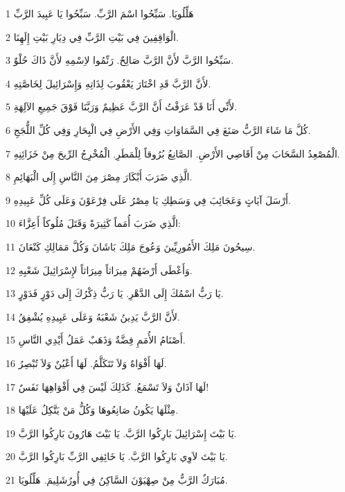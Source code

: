 \par 1 هَلِّلُويَا. سَبِّحُوا اسْمَ الرَّبِّ. سَبِّحُوا يَا عَبِيدَ الرَّبِّ
\par 2 الْوَاقِفِينَ فِي بَيْتِ الرَّبِّ فِي دِيَارِ بَيْتِ إِلَهِنَا.
\par 3 سَبِّحُوا الرَّبَّ لأَنَّ الرَّبَّ صَالِحٌ. رَنِّمُوا لاِسْمِهِ لأَنَّ ذَاكَ حُلْوٌ.
\par 4 لأَنَّ الرَّبَّ قَدِ اخْتَارَ يَعْقُوبَ لِذَاتِهِ وَإِسْرَائِيلَ لِخَاصَّتِهِ.
\par 5 لأَنِّي أَنَا قَدْ عَرَفْتُ أَنَّ الرَّبَّ عَظِيمٌ وَرَبَّنَا فَوْقَ جَمِيعِ الآلِهَةِ.
\par 6 كُلَّ مَا شَاءَ الرَّبُّ صَنَعَ فِي السَّمَاوَاتِ وَفِي الأَرْضِ فِي الْبِحَارِ وَفِي كُلِّ اللُّجَجِ.
\par 7 الْمُصْعِدُ السَّحَابَ مِنْ أَقَاصِي الأَرْضِ. الصَّانِعُ بُرُوقاً لِلْمَطَرِ. الْمُخْرِجُ الرِّيحَ مِنْ خَزَائِنِهِ.
\par 8 الَّذِي ضَرَبَ أَبْكَارَ مِصْرَ مِنَ النَّاسِ إِلَى الْبَهَائِمِ.
\par 9 أَرْسَلَ آيَاتٍ وَعَجَائِبَ فِي وَسَطِكِ يَا مِصْرُ عَلَى فِرْعَوْنَ وَعَلَى كُلِّ عَبِيدِهِ.
\par 10 الَّذِي ضَرَبَ أُمَماً كَثِيرَةً وَقَتَلَ مُلُوكاً أَعِزَّاءَ:
\par 11 سِيحُونَ مَلِكَ الأَمُورِيِّينَ وَعُوجَ مَلِكَ بَاشَانَ وَكُلَّ مَمَالِكِ كَنْعَانَ.
\par 12 وَأَعْطَى أَرْضَهُمْ مِيرَاثاً مِيرَاثاً لإِسْرَائِيلَ شَعْبِهِ.
\par 13 يَا رَبُّ اسْمُكَ إِلَى الدَّهْرِ. يَا رَبُّ ذِكْرُكَ إِلَى دَوْرٍ فَدَوْرٍ.
\par 14 لأَنَّ الرَّبَّ يَدِينُ شَعْبَهُ وَعَلَى عَبِيدِهِ يُشْفِقُ.
\par 15 أَصْنَامُ الأُمَمِ فِضَّةٌ وَذَهَبٌ عَمَلُ أَيْدِي النَّاسِ.
\par 16 لَهَا أَفْوَاهٌ وَلاَ تَتَكَلَّمُ. لَهَا أَعْيُنٌ وَلاَ تُبْصِرُ.
\par 17 لَهَا آذَانٌ وَلاَ تَسْمَعُ. كَذَلِكَ لَيْسَ فِي أَفْوَاهِهَا نَفَسٌ!
\par 18 مِثْلَهَا يَكُونُ صَانِعُوهَا وَكُلُّ مَنْ يَتَّكِلُ عَلَيْهَا.
\par 19 يَا بَيْتَ إِسْرَائِيلَ بَارِكُوا الرَّبَّ. يَا بَيْتَ هَارُونَ بَارِكُوا الرَّبَّ.
\par 20 يَا بَيْتَ لاَوِي بَارِكُوا الرَّبَّ. يَا خَائِفِي الرَّبِّ بَارِكُوا الرَّبَّ.
\par 21 مُبَارَكٌ الرَّبُّ مِنْ صِهْيَوْنَ السَّاكِنُ فِي أُورُشَلِيمَ. هَلِّلُويَا.

